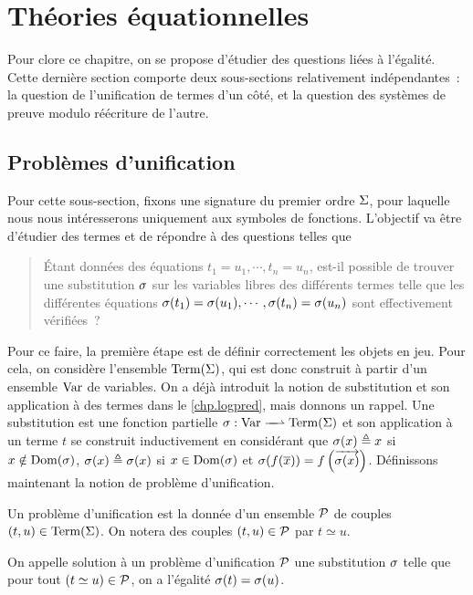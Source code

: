 \section{Théories équationnelles}

Pour clore ce chapitre, on se propose d'étudier des
questions liées à l'égalité. Cette dernière section
comporte deux sous-sections relativement indépendantes~:
la question de l'unification de termes d'un côté, et
la question des systèmes de preuve modulo réécriture de
l'autre.

\subsection{Problèmes d'unification}\label{subsec.unification}

Pour cette sous-section, fixons une signature du premier
ordre $\Sigma$, pour laquelle nous nous intéresserons
uniquement aux symboles de fonctions. L'objectif va être
d'étudier des termes et de répondre à des questions telles
que
\begin{quotation}
  \noindent
  \'Etant données des équations $t_1 = u_1, \cdots, t_n = u_n$, est-il possible
  de trouver une substitution $\sigma$ sur les variables libres des
  différents termes telle que les différentes équations
  $\sigma(t_1) = \sigma(u_1), \cdots,
  \sigma(t_n) = \sigma(u_n)$
  sont effectivement vérifiées~?
\end{quotation}

Pour ce faire, la première étape est de définir correctement
les objets en jeu. Pour cela, on considère l'ensemble
$\operatorname{Term}(\Sigma)$, qui est donc construit à partir d'un ensemble
$\operatorname{Var}$ de variables. On a déjà introduit la notion de
substitution et son application à des termes dans le
\cref{chp.logpred}, mais donnons un rappel. Une substitution
est une fonction partielle
$\makeFunNamePartial{\subSimul}{\Var}{\Term(\Sign)}$
et son application à un terme $t$ se construit inductivement
en considérant que $\sigma(x) \triangleq x$ si $x\notin \operatorname{Dom}(\sigma)$,
$\sigma(x) \triangleq \sigma(x)$ si $x\in\operatorname{Dom}(\sigma)$ et
$\sigma(f(\overline{x})) = f\left(\overrightarrow{\sigma(x)}\right)$.
Définissons maintenant la notion de problème d'unification.

\begin{definition}
  Un problème d'unification est la donnée d'un ensemble $\mathcal{P}$
  de couples $(t,u) \in \operatorname{Term}(\Sigma)$. On notera des couples
  $(t,u) \in \mathcal{P}$ par $t \simeq u$.

  On appelle solution à un problème d'unification $\mathcal{P}$ une
  substitution $\sigma$ telle que pour tout
  $(t\simeq u) \in \mathcal{P}$, on a l'égalité
  $\sigma(t) = \sigma(u)$.
\end{definition}

